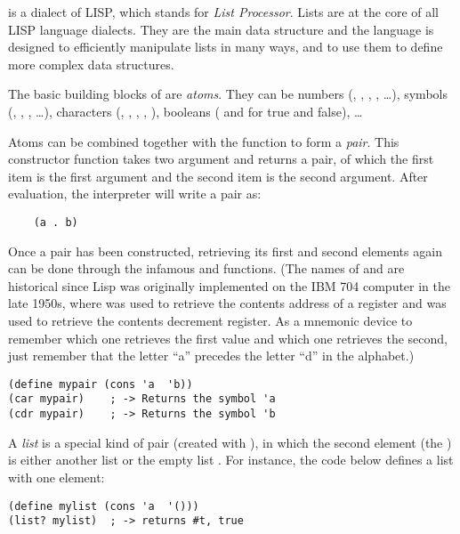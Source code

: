 \documentclass{../../../tp}
\begin{document}
\scheme is a dialect of LISP, which stands for \emph{List Processor}. Lists are at the core of all LISP language dialects. They are the main data structure and the language is designed to efficiently manipulate lists in many ways, and to use them to define more complex data structures.

The basic building blocks of \scheme are \emph{atoms}. They can be numbers (, , , , \ldots), symbols (, , , \ldots), characters (\schemecode{#\a}, \schemecode{#\Z}, \schemecode{#\(}, \schemecode{#\space}, \schemecode{#\newline}), booleans ( and  for true and false), \ldots 

Atoms can be combined together with the  function to form a \emph{pair}. This constructor function takes two argument and returns a pair, of which the first item is the first argument and the second item is the second argument. After evaluation, the \scheme interpreter will write a pair  as:

\begin{verbatim}
	(a . b)
\end{verbatim}

Once a pair has been constructed, retrieving its first and second elements again can be done through the infamous \car and \cdr functions. (The names of \car and \cdr are historical since Lisp was originally implemented on the IBM 704 computer in the late 1950s, where \car was used to retrieve the contents address of a register and \cdr was used to retrieve the contents decrement register. As a mnemonic device to remember which one retrieves the first value and which one retrieves the second, just remember that the letter ``a'' precedes the letter ``d'' in the alphabet.)

\begin{verbatim}
(define mypair (cons 'a  'b))
(car mypair)	; -> Returns the symbol 'a
(cdr mypair)	; -> Returns the symbol 'b
\end{verbatim}

A \emph{list} is a special kind of pair (created with ), in which the second element (the \cdr) is either another list or the empty list . For instance, the code below defines a list with one element:

\begin{verbatim}
(define mylist (cons 'a  '()))
(list? mylist) 	; -> returns #t, true
\end{verbatim}
\end{document}
